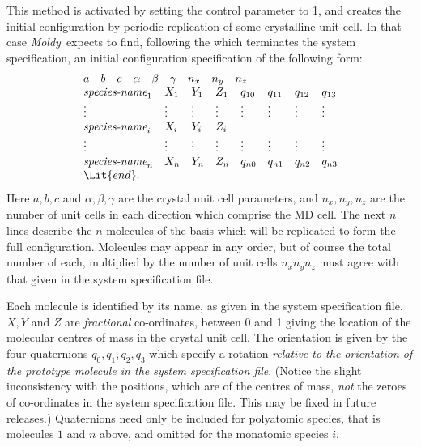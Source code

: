 \documentclass[a4paper,twoside]{report}
\newcommand{\moldy}{\emph{Moldy}}
\begin{document}
This method is activated by setting the control parameter
 to 1, and creates the initial configuration by
periodic replication of some crystalline unit cell.  In that case
\moldy\  expects to find, following the  which terminates the
system specification, an initial configuration specification of the
following form:
\begin{displaymath}
\begin{array}{llllllll}
\multicolumn{8}{l}{a \quad b \quad c \quad \alpha \quad \beta \quad
  \gamma \quad n_{x} \quad n_{y} \quad n_{z}} \\ 
\textit{species-name}_{1} &
X_{1} & Y_{1} & Z_{1} &  q_{10} & q_{11} & q_{12} & q_{13} \\
\vdots &  \vdots & \vdots & \vdots & \vdots & \vdots & \vdots & \vdots \\
\textit{species-name}_{i} & X_{i} & Y_{i} & Z_{i} \\
\vdots &  \vdots & \vdots & \vdots & \vdots & \vdots & \vdots & \vdots \\
\textit{species-name}_{n} &
X_{n} & Y_{n} & Z_{n} &  q_{n0} & q_{n1} & q_{n2} & q_{n3}  \\
\Lit{end}. \\
\end{array}
\end{displaymath}
Here $a, b, c$ and $\alpha, \beta, \gamma$ are the crystal unit cell
parameters, and $n_{x}, n_{y}, n_{z}$ are the number of unit cells in
each direction which comprise the MD cell.  The next $n$ lines
describe the $n$ molecules of the basis which will be replicated to
form the full configuration.  Molecules may appear in any order, but
of course the total number of each, multiplied by the number of unit
cells $n_{x} n_{y} n_{z}$ must agree with that given in the system
specification file.

Each molecule is identified by its name, as given in the system
specification file.  $X, Y$ and $Z$ are \emph{fractional}
co-ordinates, between 0 and 1 giving the location of the molecular
centres of mass in the crystal unit cell. The orientation is given by
the four quaternions $q_{0}, q_{1}, q_{2}, q_{3}$ which specify a
rotation \emph{relative to the orientation of the prototype molecule
  in the system specification file}.  (Notice the slight inconsistency
with the positions, which are of the centres of mass, \emph{not} the
zeroes of co-ordinates in the system specification file. This may be
fixed in future releases.)  Quaternions need only be included for
polyatomic species, that is molecules $1$ and $n$ above, and omitted
for the monatomic species $i$.
\end{document}
